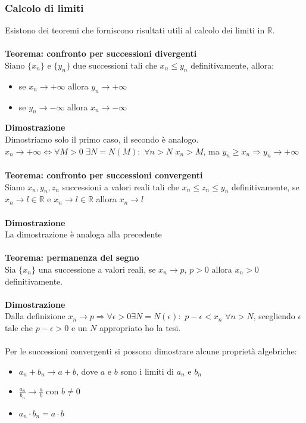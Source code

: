 \documentclass{article}
\begin{document}
\subsubsection{Calcolo di limiti}
Esistono dei teoremi che forniscono risultati utili al calcolo dei limiti in $\mathds{R}$.\\\\
\textbf{Teorema: confronto per successioni divergenti}\\
Siano $\{x_n\}$ e $\{y_n\}$ due successioni tali che $x_n\leq y_n$ definitivamente, allora:\begin{itemize}
    \item se $x_n\rightarrow+\infty$ allora $y_n\rightarrow+\infty$
    \item se $y_n\rightarrow-\infty$ allora $x_n\rightarrow-\infty$
\end{itemize}
\textbf{Dimostrazione}\\
Dimostriamo solo il primo caso, il secondo è analogo.\\
$x_n\rightarrow+\infty\Leftrightarrow\forall M>0$ $\exists N=N(M):$ $\forall n>N$ $x_n>M$, ma $y_n\geq x_n\Rightarrow y_n\rightarrow+\infty$\\
\\
\textbf{Teorema: confronto per successioni convergenti}\\
Siano $x_n,y_n,z_n$ successioni a valori reali tali che $x_n\leq z_n\leq y_n$ definitivamente, se $x_n\rightarrow l\in\mathds{R}$ e $x_n\rightarrow l\in\mathds{R}$ allora $x_n\rightarrow l$\\\\
\textbf{Dimostrazione}\\
La dimostrazione è analoga alla precedente\\\\
\textbf{Teorema: permanenza del segno}\\
Sia $\{x_n\}$ una successione a valori reali, se $x_n\rightarrow p$, $p>0$ allora $x_n>0$ definitivamente.\\\\
\textbf{Dimostrazione}\\
Dalla definizione $x_n\rightarrow p \Rightarrow \forall\epsilon>0\exists N=N(\epsilon):$ $p-\epsilon<x_n$ $\forall n>N$, scegliendo $\epsilon$ tale che $p-\epsilon>0$ e un $N$ appropriato ho la tesi.\\
\\
Per le successioni convergenti si possono dimostrare alcune proprietà algebriche:
\begin{itemize}
    \item $a_n+b_n\rightarrow a+b$, dove $a$ e $b$ sono i limiti di $a_n$ e $b_n$
    \item $\frac{a_n}{b_n}\rightarrow\frac{a}{b}$ con $b\neq0$
    \item $a_n\cdot b_n=a\cdot b$
\end{itemize}
\end{document}
